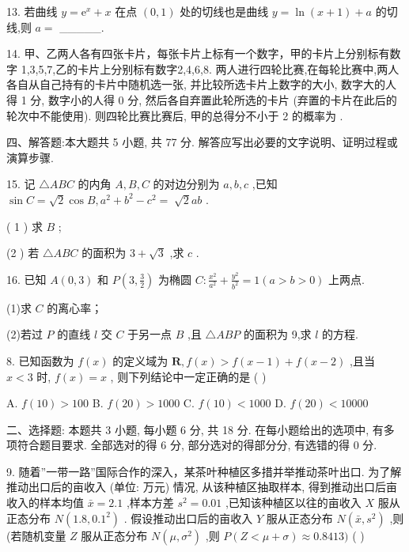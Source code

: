 \documentclass[10pt]{article}
\begin{document}
13. 若曲线 \(y = {\mathrm{e}}^{x} + x\) 在点 \(\left( {0,1}\right)\) 处的切线也是曲线 \(y = \ln \left( {x + 1}\right)  + a\) 的切线,则 \(a =\) \_\_\_\_\_.

14. 甲、乙两人各有四张卡片，每张卡片上标有一个数字，甲的卡片上分别标有数字 1,3,5,7,乙的卡片上分别标有数字2,4,6,8. 两人进行四轮比赛,在每轮比赛中,两人各自从自己持有的卡片中随机选一张, 并比较所选卡片上数字的大小, 数字大的人得 1 分, 数字小的人得 0 分, 然后各自弃置此轮所选的卡片 (弃置的卡片在此后的轮次中不能使用). 则四轮比赛比赛后, 甲的总得分不小于 2 的概率为 .

四、解答题:本大题共 5 小题, 共 77 分. 解答应写出必要的文字说明、证明过程或演算步骤.

15. 记 \(\bigtriangleup {ABC}\) 的内角 \(A,B,C\) 的对边分别为 \(a,b,c\) ,已知 \(\sin C = \sqrt{2}\cos B,{a}^{2} + {b}^{2} - {c}^{2} = \; \sqrt{2}{ab}\) .

( 1 ) 求 \(B\) ;

(2 ) 若 \(\bigtriangleup {ABC}\) 的面积为 \(3 + \sqrt{3}\) ,求 \(c\) .

16. 已知 \(A\left( {0,3}\right)\) 和 \(P\left( {3,\frac{3}{2}}\right)\) 为椭圆 \(C : \frac{{x}^{2}}{{a}^{2}} + \frac{{y}^{2}}{{b}^{2}} = 1\left( {a > b > 0}\right)\) 上两点.

(1)求 \(C\) 的离心率；

(2)若过 \(P\) 的直线 \(l\) 交 \(C\) 于另一点 \(B\) ,且 \(\bigtriangleup {ABP}\) 的面积为 9,求 \(l\) 的方程.

8. 已知函数为 \(f\left( x\right)\) 的定义域为 \(\mathbf{R},f\left( x\right)  > f\left( {x - 1}\right)  + f\left( {x - 2}\right)\) ,且当 \(x < 3\) 时, \(f\left( x\right)  = x\) , 则下列结论中一定正确的是 (   )

A. \(f\left( {10}\right)  > {100}\) B. \(f\left( {20}\right)  > {1000}\) C. \(f\left( {10}\right)  < {1000}\) D. \(f\left( {20}\right)  < {10000}\)

二、选择题: 本题共 3 小题, 每小题 6 分, 共 18 分. 在每小题给出的选项中, 有多项符合题目要求. 全部选对的得 6 分, 部分选对的得部分分, 有选错的得 0 分.

9. 随着”一带一路”国际合作的深入，某茶叶种植区多措并举推动茶叶出口. 为了解推动出口后的亩收入 (单位: 万元) 情况, 从该种植区抽取样本, 得到推动出口后亩收入的样本均值 \(\bar{x} = {2.1}\) ,样本方差 \({s}^{2} = {0.01}\) ,已知该种植区以往的亩收入 \(X\) 服从正态分布 \(N\left( {{1.8},{0.1}^{2}}\right)\) . 假设推动出口后的亩收入 \(Y\) 服从正态分布 \(N\left( {\bar{x},{s}^{2}}\right)\) ,则 (若随机变量 \(Z\) 服从正态分布 \(N\left( {\mu ,{\sigma }^{2}}\right)\) ,则 \(P\left( {Z < \mu  + \sigma }\right)  \approx  {0.8413})\) ( )
\end{document}
